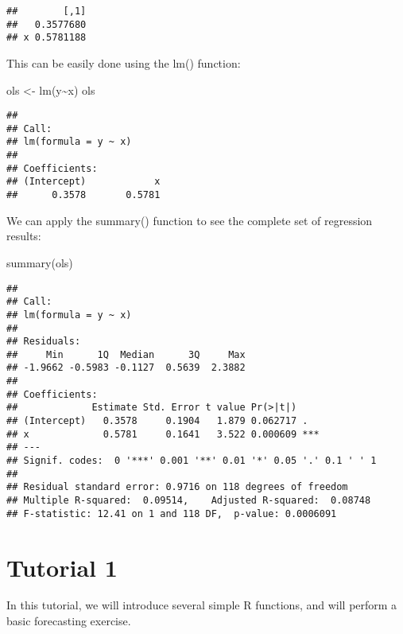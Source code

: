 \documentclass[
  oneside]{book}
\newenvironment{Shaded}{\begin{snugshade}}{\end{snugshade}}
\newcommand{\FunctionTok}[1]{\textcolor[rgb]{0.00,0.00,0.00}{#1}}
\newcommand{\NormalTok}[1]{#1}
\newcommand{\OtherTok}[1]{\textcolor[rgb]{0.56,0.35,0.01}{#1}}
\newcommand{\SpecialCharTok}[1]{\textcolor[rgb]{0.00,0.00,0.00}{#1}}
\begin{document}
\begin{verbatim}
##        [,1]
##   0.3577680
## x 0.5781188
\end{verbatim}

This can be easily done using the lm() function:

\begin{Shaded}
\begin{Highlighting}[]
\NormalTok{ols }\OtherTok{\textless{}{-}} \FunctionTok{lm}\NormalTok{(y}\SpecialCharTok{\textasciitilde{}}\NormalTok{x)}
\NormalTok{ols}
\end{Highlighting}
\end{Shaded}

\begin{verbatim}
## 
## Call:
## lm(formula = y ~ x)
## 
## Coefficients:
## (Intercept)            x  
##      0.3578       0.5781
\end{verbatim}

We can apply the summary() function to see the complete set of regression results:

\begin{Shaded}
\begin{Highlighting}[]
\FunctionTok{summary}\NormalTok{(ols)}
\end{Highlighting}
\end{Shaded}

\begin{verbatim}
## 
## Call:
## lm(formula = y ~ x)
## 
## Residuals:
##     Min      1Q  Median      3Q     Max 
## -1.9662 -0.5983 -0.1127  0.5639  2.3882 
## 
## Coefficients:
##             Estimate Std. Error t value Pr(>|t|)    
## (Intercept)   0.3578     0.1904   1.879 0.062717 .  
## x             0.5781     0.1641   3.522 0.000609 ***
## ---
## Signif. codes:  0 '***' 0.001 '**' 0.01 '*' 0.05 '.' 0.1 ' ' 1
## 
## Residual standard error: 0.9716 on 118 degrees of freedom
## Multiple R-squared:  0.09514,    Adjusted R-squared:  0.08748 
## F-statistic: 12.41 on 1 and 118 DF,  p-value: 0.0006091
\end{verbatim}

\hypertarget{tutorial-1}{%
\chapter*{Tutorial 1}\label{tutorial-1}}

In this tutorial, we will introduce several simple R functions, and will perform a basic forecasting exercise.
\end{document}
